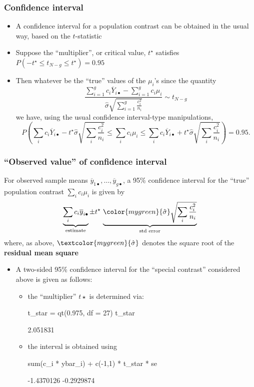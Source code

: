 \documentclass[a4paper]{article}
\begin{document}
\subsubsection{Confidence interval}
\begin{itemize}
	\item A confidence interval for a population contrast can be obtained in the usual way, based on the \( t \)-statistic
	\item Suppose the ``multiplier'', or critical value, \( t^\star \) satisfies \( P(-t^\star \leq t_{N-g}\leq t^\star)=0.95 \) 
	\item Then whatever be the ``true'' values of the \( \mu_i \)'s since the quantity
	\[
		\frac{\sum_{i=1}^gc_i\overline Y_{i\bullet}-\sum_{i=1}^gc_i\mu_i}{ \hat\sigma\sqrt{\sum_{i=1}^g \frac{c_i^2}{n_i}}} \sim t_{N-g}
	\]
	we have, using the usual confidence interval-type manipulations,
	\[
		P \left( \sum_ic_i\overline Y_{i\bullet}- t^\star \hat{\sigma}\sqrt{\sum_i \frac{c_i^2}{n_i}} \leq \sum_ic_i\mu_i \leq \sum_ic_i\overline Y_{i\bullet}+ t^\star \hat{\sigma}\sqrt{\sum_i \frac{c_i^2}{n_i}} \right)=0.95.
	\]
\end{itemize}
\subsubsection{``Observed value'' of confidence interval}
For observed sample means \( \overline{y}_{1\bullet},\dotsc,\overline{y}_{g\bullet} \), a 95\% confidence interval for the ``true'' population contrast \( \sum_{i} c_i \mu_i \) is given by
\[
	\underbrace{\sum_ic_i\overline y_{i\bullet}}_{\text{estimate}}\pm t^\star\,  \underbrace{\color{mygreen}{\hat{\sigma}}\sqrt{\sum_i \frac{c_i^2}{n_i}}}_{\text{std error}}
\]
where, as above,  \( \textcolor{mygreen}{\hat{\sigma}} \) denotes the square root of the \textcolor{mygreen}{\textbf{residual mean square}}
\begin{itemize}
	\item A two-sided 95\% confidence interval for the ``special contrast'' considered above is given as follows:
	\begin{itemize}
		\item the ``multiplier'' \( t\star \) is determined via:
\begin{Schunk}
\begin{Sinput}
t_star = qt(0.975, df = 27)
t_star
\end{Sinput}
\begin{Soutput}
[1] 2.051831
\end{Soutput}
\end{Schunk}
		\item the interval is obtained using
\begin{Schunk}
\begin{Sinput}
sum(c_i * ybar_i) + c(-1,1) * t_star * se
\end{Sinput}
\begin{Soutput}
[1] -1.4370126 -0.2929874
\end{Soutput}
\end{Schunk}
	\end{itemize}
\end{itemize}
\end{document}
